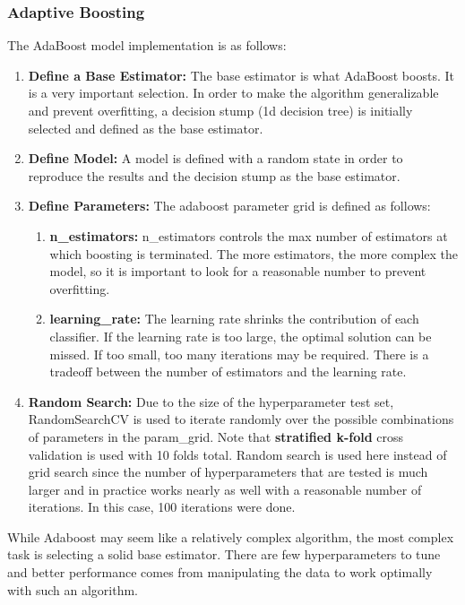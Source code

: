 \documentclass[11pt]{article}
\begin{document}
	\subsubsection{Adaptive Boosting}
		The AdaBoost model implementation is as follows:
		\begin{enumerate}
			\item \textbf{Define a Base Estimator:} The base estimator is what AdaBoost boosts. It is a very important selection. In order to make the algorithm generalizable and prevent overfitting, a decision stump (1d decision tree) is initially selected and defined as the base estimator.
			\item \textbf{Define Model:} A model is defined with a random state in order to reproduce the results and the decision stump as the base estimator.
			\item \textbf{Define Parameters:} The adaboost parameter grid is defined as follows: 
			\begin{enumerate}
				\item  \textbf{n\_estimators:} n\_estimators controls the max number of estimators at which boosting is terminated. The more estimators, the more complex the model, so it is important to look for a reasonable number to prevent overfitting.
				\item \textbf{learning\_rate:} The learning rate shrinks the contribution of each classifier. If the learning rate is too large, the optimal solution can be missed. If too small, too many iterations may be required. There is a tradeoff between the number of estimators and the learning rate.
			\end{enumerate}
			\item \textbf{Random Search:} Due to the size of the hyperparameter test set, RandomSearchCV is used to iterate randomly over the possible combinations of parameters in the param\_grid. Note that \textbf{stratified k-fold} cross validation is used with 10 folds total. Random search is used here instead of grid search since the number of hyperparameters that are tested is much larger and in practice works nearly as well with a reasonable number of iterations. In this case, 100 iterations were done.
		\end{enumerate}	
	
	While Adaboost may seem like a relatively complex algorithm, the most complex task is selecting a solid base estimator. There are few hyperparameters to tune and better performance comes from manipulating the data to work optimally with such an algorithm.
	
\end{document}
